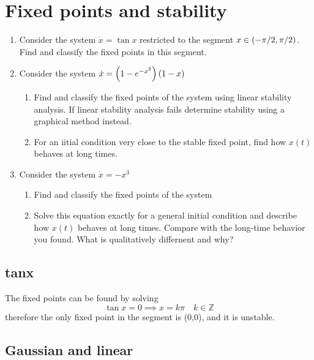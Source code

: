 \clearpage
\section{Fixed points and stability}
\begin{colbox}
	\begin{enumerate}
		\item Consider the system \(\dot{x}=\tan x\) restricted to the segment \(x \in \left(-\pi/2,\pi/2\right)\). Find and classify the fixed points in this segment.
		\item Consider the system \(\dot{x} = \left(1-e^{-x^2}\right)\left(1-x\right)\) \begin{enumerate}
			\item Find and classify the fixed points of the system using linear stability analysis. If linear stability analysis fails determine stability using a graphical method instead.
			\item For an iitial condition very close to the stable fixed point, find how \(x(t)\) behaves at long times.
		\end{enumerate}
		\item Consider the system \(\dot{x}=-x^3\)\begin{enumerate}
			\item Find and classify the fixed points of the system
			\item Solve this equation exactly for a general initial condition and describe how \(x(t)\) behaves at long times. Compare with the long-time behavior you found. What is qualitatively differnent and why?
		\end{enumerate}
	\end{enumerate}
\end{colbox}
\subsection{tanx}
The fixed points can be found by solving
\begin{equation}
	\tan x = 0 \implies x=k\pi \quad k\in\mathbb{Z}
\end{equation}
therefore the only fixed point in the segment is (0,0), and it is unstable.
\subsection{Gaussian and linear}
